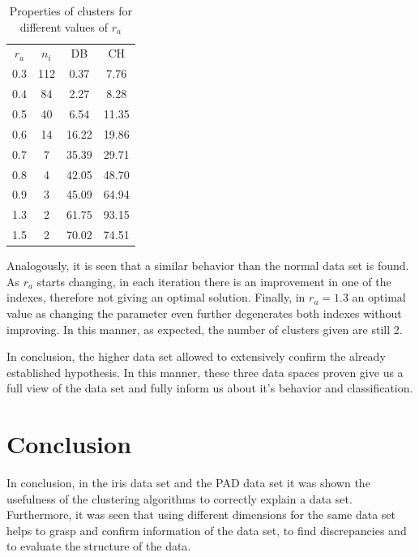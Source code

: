\documentclass[conference]{IEEEtran}
\theoremstyle{definition}
\theoremstyle{remark}
\theoremstyle{remark}
\begin{document}
\begin{table}
  \centering
  \begin{tabular}{cccc}
    \hline
    $r_a$ & $n_i$ & DB    & CH    \\
    0.3   & 112   & 0.37  & 7.76  \\
    0.4   & 84    & 2.27  & 8.28  \\
    0.5   & 40    & 6.54  & 11.35 \\
    0.6   & 14    & 16.22 & 19.86 \\
    0.7   & 7     & 35.39 & 29.71 \\
    0.8   & 4     & 42.05 & 48.70 \\
    0.9   & 3     & 45.09 & 64.94 \\
    1.3   & 2     & 61.75 & 93.15 \\
    1.5   & 2     & 70.02 & 74.51 \\ \hline
  \end{tabular}
  \caption{Properties of clusters for different values of $r_{a}$}
  \label{tab:exphds}
\end{table}

Analogously, it is seen that a similar behavior than the normal data set is
found. As $r_{a}$ starts changing, in each iteration there is an improvement in
one of the indexes, therefore not giving an optimal solution. Finally, in
$r_{a}=1.3$ an optimal value as changing the parameter even further degenerates
both indexes without improving. In this manner, as expected, the number of
clusters given are still 2.

In conclusion, the higher data set allowed to extensively confirm the already
established hypothesis. In this manner, these three data spaces proven give us a
full view of the data set and fully inform us about it's behavior and
classification.

\section{Conclusion}

In conclusion, in the iris data set and the PAD data set it was shown the
usefulness of the clustering algorithms to correctly explain a data set.
Furthermore, it was seen that using different dimensions for the same data set
helps to grasp and confirm information of the data set, to find discrepancies
and to evaluate the structure of the data.

\printbibliography
\end{document}
